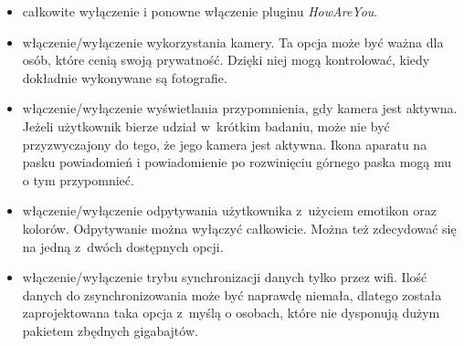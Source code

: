 \begin{itemize}
	\item całkowite wyłączenie i ponowne włączenie pluginu \textit{HowAreYou}.
	
	\item włączenie/wyłączenie wykorzystania kamery. Ta opcja może być ważna dla osób, które cenią swoją prywatność. Dzięki niej mogą kontrolować, kiedy dokładnie wykonywane są fotografie.
	
	\item włączenie/wyłączenie wyświetlania przypomnienia, gdy kamera jest aktywna. Jeżeli użytkownik bierze udział w~krótkim badaniu, może nie być przyzwyczajony do tego, że jego kamera jest aktywna. Ikona aparatu na pasku powiadomień i powiadomienie po rozwinięciu górnego paska mogą mu o tym przypomnieć.
	
	\item włączenie/wyłączenie odpytywania użytkownika z~użyciem emotikon oraz kolorów. Odpytywanie można wyłączyć całkowicie. Można też zdecydować się na jedną z~dwóch dostępnych opcji.
	
	\item włączenie/wyłączenie trybu synchronizacji danych tylko przez wifi. Ilość danych do zsynchronizowania może być naprawdę niemała, dlatego została zaprojektowana taka opcja z~myślą o osobach, które nie dysponują dużym pakietem zbędnych gigabajtów.
	

\end{itemize}
